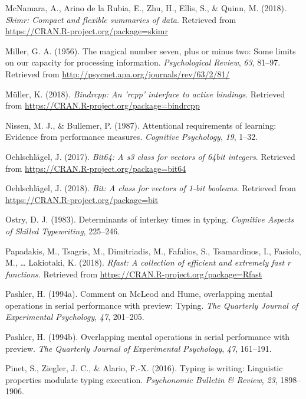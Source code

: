 \documentclass[floatsintext,man]{apa6}
\theoremstyle{definition}
\theoremstyle{definition}
\theoremstyle{definition}
\theoremstyle{remark}
\begin{document}
\hypertarget{ref-R-skimr}{}
McNamara, A., Arino de la Rubia, E., Zhu, H., Ellis, S., \& Quinn, M.
(2018). \emph{Skimr: Compact and flexible summaries of data}. Retrieved
from \url{https://CRAN.R-project.org/package=skimr}

\hypertarget{ref-miller_magical_1956}{}
Miller, G. A. (1956). The magical number seven, plus or minus two: Some
limits on our capacity for processing information. \emph{Psychological
Review}, \emph{63}, 81--97. Retrieved from
\url{http://psycnet.apa.org/journals/rev/63/2/81/}

\hypertarget{ref-R-bindrcpp}{}
Müller, K. (2018). \emph{Bindrcpp: An 'rcpp' interface to active
bindings}. Retrieved from
\url{https://CRAN.R-project.org/package=bindrcpp}

\hypertarget{ref-NissenAttentionalrequirementslearning1987}{}
Nissen, M. J., \& Bullemer, P. (1987). Attentional requirements of
learning: Evidence from performance measures. \emph{Cognitive
Psychology}, \emph{19}, 1--32.

\hypertarget{ref-R-bit64}{}
Oehlschlägel, J. (2017). \emph{Bit64: A s3 class for vectors of 64bit
integers}. Retrieved from \url{https://CRAN.R-project.org/package=bit64}

\hypertarget{ref-R-bit}{}
Oehlschlägel, J. (2018). \emph{Bit: A class for vectors of 1-bit
booleans}. Retrieved from \url{https://CRAN.R-project.org/package=bit}

\hypertarget{ref-OstryDeterminantsinterkeytimes1983}{}
Ostry, D. J. (1983). Determinants of interkey times in typing.
\emph{Cognitive Aspects of Skilled Typewriting}, 225--246.

\hypertarget{ref-R-Rfast}{}
Papadakis, M., Tsagris, M., Dimitriadis, M., Fafalios, S., Tsamardinos,
I., Fasiolo, M., \ldots{} Lakiotaki, K. (2018). \emph{Rfast: A
collection of efficient and extremely fast r functions}. Retrieved from
\url{https://CRAN.R-project.org/package=Rfast}

\hypertarget{ref-pashler_comment_1994}{}
Pashler, H. (1994a). Comment on McLeod and Hume, overlapping mental
operations in serial performance with preview: Typing. \emph{The
Quarterly Journal of Experimental Psychology}, \emph{47}, 201--205.

\hypertarget{ref-pashler_overlapping_1994}{}
Pashler, H. (1994b). Overlapping mental operations in serial performance
with preview. \emph{The Quarterly Journal of Experimental Psychology},
\emph{47}, 161--191.

\hypertarget{ref-PinetTypingwritingLinguistic2016}{}
Pinet, S., Ziegler, J. C., \& Alario, F.-X. (2016). Typing is writing:
Linguistic properties modulate typing execution. \emph{Psychonomic
Bulletin \& Review}, \emph{23}, 1898--1906.
\end{document}
